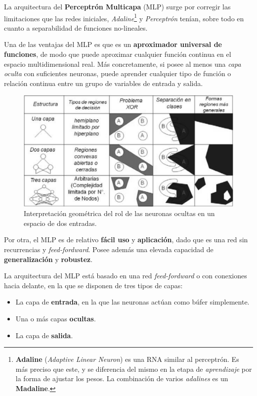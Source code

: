 \documentclass[10pt,a4paper]{article}
\begin{document}
La arquitectura del \textbf{Perceptrón Multicapa} (MLP) surge por corregir las limitaciones que las redes iniciales, \textit{Adaline}\footnote{\textbf{Adaline} (\textit{Adaptive Linear Neuron}) es una RNA similar al perceptrón. Es más preciso que este, y se diferencia del mismo en la etapa de \textit{aprendizaje} por la forma de ajustar los pesos. La combinación de varios \textit{adalines} es un \textbf{Madaline}.} y \textit{Perceptrón} tenían, sobre todo en cuanto a separabilidad de funciones no-lineales.

Una de las ventajas del MLP es que es un \textbf{aproximador universal de funciones}, de modo que puede aproximar cualquier función continua en el espacio multidimensional real. Más concretamente, si posee al menos una \textit{capa oculta} con suficientes neuronas, puede aprender cualquier tipo de función o relación continua entre un grupo de variables de entrada y salida. 

\begin{figure}[ht!]
  \label{fig:layers}
  \caption{Interpretación geométrica del rol de las neuronas ocultas en un espacio de dos entradas.}
  \centerline{\includegraphics[width=0.75\textwidth-\fboxrule-\fboxrule]{imgs/layers.png}}  
\end{figure}	

Por otra, el MLP es de relativo \textbf{fácil uso} y \textbf{aplicación}, dado que es una red sin recurrencias y \textit{feed-fordward}. Posee además una elevada capacidad de \textbf{generalización} y \textbf{robustez}.

La arquitectura del MLP está basado en una red \textit{feed-fordward} o con conexiones hacia delante, en la que se disponen de tres tipos de capas:
\begin{itemize}
\item La capa de \textbf{entrada}, en la que las neuronas actúan como búfer simplemente.
\item Una o más capas \textbf{ocultas}.
\item La capa de \textbf{salida}.
\end{itemize}
\end{document}
